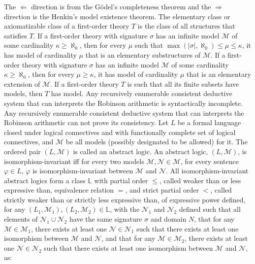\documentclass[a4paper,12pt]{article}
\begin{document}
The $\Leftarrow$ direction is from the Gödel's completeness theorem and the $\Rightarrow$ direction is the Henkin's model existence theorem.
The elementary class or axiomatizable class of a first-order theory $T$ is the class of all structures that satisfies $T$.
If a first-order theory with signature $\sigma$ has an infinite model $\mathcal{M}$ of some cardinality $\kappa\geq\aleph_0$, then for every $\mu$ such that $\max(|\sigma|,\aleph_0)\leq\mu\leq\kappa$, it has model of cardinality $\mu$ that is an elementary substructures of $\mathcal{M}$.
If a first-order theory with signature $\sigma$ has an infinite model $\mathcal{M}$ of some cardinality $\kappa\geq\aleph_0$, then for every $\mu\geq\kappa$, it has model of cardinality $\mu$ that is an elementary extension of $\mathcal{M}$.
If a first-order theory $T$ is such that all its finite subsets have models, then $T$ has model.
Any recursively enumerable consistent deductive system that can interprets the Robinson arithmetic is syntactically incomplete.
Any recursively enumerable consistent deductive system that can interprets the Robinson arithmetic can not prove its consistency.
Let $L$ be a formal language closed under logical connectives and with functionally complete set of logical connectives, and $\mathscr{M}$ be all models (possibly designated to be allowed) for it. The ordered pair $(L,\mathscr{M})$ is called an abstract logic.
An abstract logic, $(L,\mathscr{M})$, is isomorphism-invariant iff for every two models $\mathcal{M},\mathcal{N}\in\mathscr{M}$, for every sentence $\varphi\in L$, $\varphi$ is isomorphism-invariant between $\mathcal{M}$ and $\mathcal{N}$.
All isomorphism-invariant abstract logics form a class $\mathbb{L}$ with partial order $\leq$, called weaker than or less expressive than, equivalence relation $=$, and strict partial order $<$, called strictly weaker than or strictly less expressive than, of expressive power defined, for any $(L_1,\mathscr{M}_1),(L_2,\mathscr{M}_2)\in\mathbb{L}$, with the $\mathscr{N}_1$ and $\mathscr{N}_2$ defined such that all elements of $\mathscr{N}_1\cup\mathscr{N}_2$ have the same signature $\sigma$ and domain $N$, that for any $\mathcal{M}\in\mathscr{M}_1$, there exists at least one $\mathcal{N}\in\mathscr{N}_1$ such that there exists at least one isomorphism between $\mathcal{M}$ and $\mathcal{N}$, and that for any $\mathcal{M}\in\mathscr{M}_2$, there exists at least one $\mathcal{N}\in\mathscr{N}_2$ such that there exists at least one isomorphism between $\mathcal{M}$ and $\mathcal{N}$, as:
\end{document}
